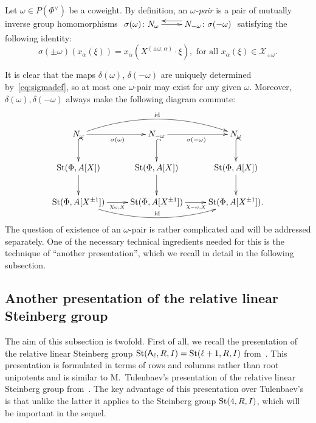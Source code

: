 \begin{dfn} \label{dfn:delta-pair}
Let $\omega \in P(\Phi^\vee)$ be a coweight.
By definition, an {\it $\omega$-pair} is a pair of mutually inverse group homomorphisms
$\xymatrix{ \sigma(\omega)\colon N_\omega \ar[r] & \ar@<-1.0ex>[l] N_{-\omega}\colon \sigma(-\omega) }$ satisfying the following identity:
\begin{equation} \label{eq:sigmadef}
\sigma(\pm \omega)(x_\alpha(\xi)) = x_\alpha(X^{(\pm \omega, \alpha)}\cdot \xi),
\text{ for all } x_\alpha(\xi) \in \mathcal{X}_{\pm\omega}.
\end{equation}\end{dfn}
It is clear that the maps $\delta(\omega)$, $\delta(-\omega)$ are uniquely determined by~\eqref{eq:sigmadef}, so at most one $\omega$-pair may exist for any given $\omega$.
Moreover, $\delta(\omega), \delta(-\omega)$ always make the following diagram commute:
\begin{equation} \label{eq:sigma-diagram}
\xymatrix{ N_\omega \ar[r]_{\sigma(\omega)}\ar@{^{(}->}[d] \ar@/^1.5pc/[rr]^{\mathrm{id}} & N_{-\omega} \ar@{^{(}->}[d] \ar[r]_{\sigma(-\omega)} & N_\omega \ar@{^{(}->}[d] \\
\St(\Phi, A[X]) \ar[d] & \St(\Phi, A[X]) \ar[d] & \St(\Phi, A[X]) \ar[d] \\
\St(\Phi, A[X^{\pm 1}]) \ar@<-0.0ex>[r]_{\chi_{\omega, X}} \ar@/_1.5pc/[rr]^{\mathrm{id}} & \St(\Phi, A[X^{\pm 1}]) \ar@<-0.0ex>[r]_{\chi_{-\omega, X}} & \St(\Phi, A[X^{\pm 1}]).} \end{equation}
The question of existence of an $\omega$-pair is rather complicated and will be addressed separately.
One of the necessary technical ingredients needed for this is the technique of ``another presentation'',
  which we recall in detail in the following subsection.

\subsection{Another presentation of the relative linear Steinberg group}
The aim of this subsection is twofold.
First of all, we recall the presentation of the relative linear Steinberg group $\operatorname{St}(\mathsf{A}_\ell, R, I) = \operatorname{St}(\ell+1, R, I)$ from~\cite{LS17}.
This presentation is formulated in terms of rows and columns rather than root unipotents and is similar to
 M.~Tulenbaev's presentation of the relative linear Steinberg group from~\cite[Definition~1.5]{Tu83}.
The key advantage of this presentation over Tulenbaev's is that unlike the latter it applies to the Steinberg group $\operatorname{St}(4, R, I)$,
 which will be important in the sequel.

